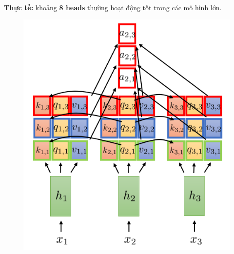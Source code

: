 \documentclass{book}
\begin{document}
    \textbf{Thực tế:} khoảng \textbf{8 heads} thường hoạt động tốt trong các mô hình lớn.
    \begin{figure}[H]
        \centering
        \includegraphics[width=0.5\linewidth]{images/mtha.png}

    \end{figure}
\end{document}
